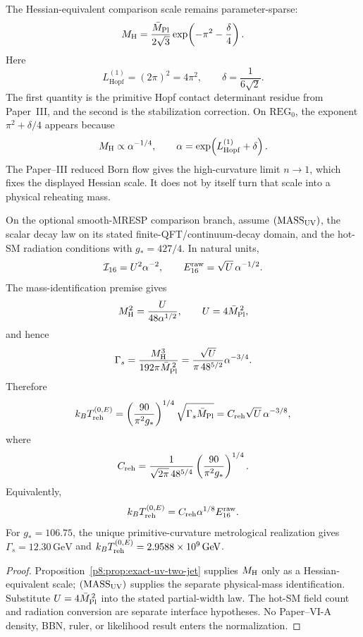 \documentclass[12pt,a4paper]{article}
\begin{document}
The Hessian-equivalent comparison scale remains parameter-sparse:
\[
M_{\rm H}
=
\frac{\bar M_{\rm Pl}}{2\sqrt3}
\exp\!\left(-\pi^2-\frac{\delta}{4}\right).
\]
Here
\[
L_{\mathrm{Hopf}}^{(1)}=(2\pi)^2=4\pi^2,
\qquad
\delta=\frac{1}{6\sqrt2}.
\]
The first quantity is the primitive Hopf contact determinant residue from
Paper~III, and the second is the stabilization correction.  On
\(\mathrm{REG}_0\), the exponent \(\pi^2+\delta/4\) appears because
\[
M_{\rm H}\propto\alpha^{-1/4},
\qquad
\alpha=\exp\!\left(L_{\mathrm{Hopf}}^{(1)}+\delta\right).
\]
The Paper--III reduced Born flow gives the high-curvature limit \(n\to1\),
which fixes the displayed Hessian scale.  It does not by itself turn that
scale into a physical reheating mass.


\begin{theorem}
\label{p8:thm:scalaron-decay-reheating-rung}
On the optional smooth-MRESP comparison branch, assume \((\mathrm{MASS}_{\rm UV})\), the scalar decay law on its stated finite-QFT/continuum-decay domain, and the hot-SM radiation conditions with \(g_*=427/4\).  In natural units,
\[
 \mathcal I_{16}=U^2\alpha^{-2},\qquad
 E_{16}^{\rm raw}=\sqrt U\,\alpha^{-1/2}.
\]
The mass-identification premise gives
\[
 M_{\rm H}^2=\frac{U}{48\alpha^{1/2}},\qquad
 U=4\bar M_{\rm Pl}^{\,2},
\]
and hence
\[
 \Gamma_s=\frac{M_{\rm H}^3}{192\pi\bar M_{\rm Pl}^{\,2}}
 =\frac{\sqrt U}{\pi\,48^{5/2}}\alpha^{-3/4}.
\]
Therefore
\begin{equation}
\label{p8:eq:Treh-action-rung-derived}
 k_BT_{\rm reh}^{(0,E)}
 =\left(\frac{90}{\pi^2g_*}\right)^{1/4}
 \sqrt{\Gamma_s\bar M_{\rm Pl}}
 =C_{\rm reh}\sqrt U\,\alpha^{-3/8},
\end{equation}
where
\begin{equation}
\label{p8:eq:C-reh-derived}
 C_{\rm reh}=\frac{1}{\sqrt{2\pi}\,48^{5/4}}
 \left(\frac{90}{\pi^2g_*}\right)^{1/4}.
\end{equation}
Equivalently,
\[
 k_BT_{\rm reh}^{(0,E)}=C_{\rm reh}\alpha^{1/8}E_{16}^{\rm raw}.
\]
For \(g_*=106.75\), the unique primitive-curvature metrological realization gives
\(\Gamma_s=12.30\,\mathrm{GeV}\) and
\(k_BT_{\rm reh}^{(0,E)}=2.9588\times10^9\,\mathrm{GeV}\).
\end{theorem}

\begin{proof}
Proposition~\ref{p8:prop:exact-uv-two-jet} supplies \(M_{\rm H}\) only as a Hessian-equivalent scale; \((\mathrm{MASS}_{\rm UV})\) supplies the separate physical-mass identification.  Substitute \(U=4\bar M_{\rm Pl}^{\,2}\) into the stated partial-width law.  The hot-SM field count and radiation conversion are separate interface hypotheses.  No Paper--VI-A density, BBN, ruler, or likelihood result enters the normalization.
\end{proof}
\end{document}
